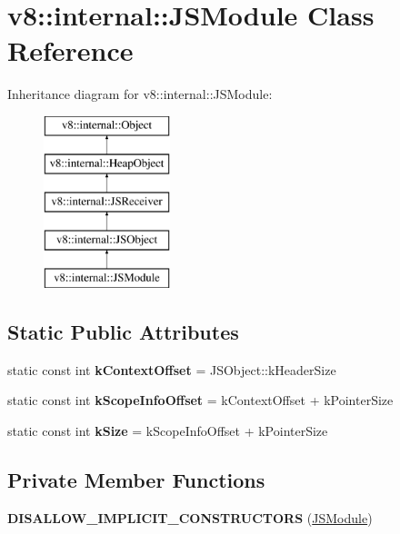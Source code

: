 \hypertarget{classv8_1_1internal_1_1_j_s_module}{}\section{v8\+:\+:internal\+:\+:J\+S\+Module Class Reference}
\label{classv8_1_1internal_1_1_j_s_module}
Inheritance diagram for v8\+:\+:internal\+:\+:J\+S\+Module\+:\begin{figure}[H]
\begin{center}
\leavevmode
\includegraphics[height=5.000000cm]{classv8_1_1internal_1_1_j_s_module}
\end{center}
\end{figure}
\subsection*{Static Public Attributes}
\begin{DoxyCompactItemize}
\item 
static const int {\bfseries k\+Context\+Offset} = J\+S\+Object\+::k\+Header\+Size\hypertarget{classv8_1_1internal_1_1_j_s_module_a9726969c27afae856ac1b2eb59671b55}{}\label{classv8_1_1internal_1_1_j_s_module_a9726969c27afae856ac1b2eb59671b55}

\item 
static const int {\bfseries k\+Scope\+Info\+Offset} = k\+Context\+Offset + k\+Pointer\+Size\hypertarget{classv8_1_1internal_1_1_j_s_module_ac143be923b04c13b6145e99b44643225}{}\label{classv8_1_1internal_1_1_j_s_module_ac143be923b04c13b6145e99b44643225}

\item 
static const int {\bfseries k\+Size} = k\+Scope\+Info\+Offset + k\+Pointer\+Size\hypertarget{classv8_1_1internal_1_1_j_s_module_acd14eb06c5ad2c3b532f178a7402b71b}{}\label{classv8_1_1internal_1_1_j_s_module_acd14eb06c5ad2c3b532f178a7402b71b}

\end{DoxyCompactItemize}
\subsection*{Private Member Functions}
\begin{DoxyCompactItemize}
\item 
{\bfseries D\+I\+S\+A\+L\+L\+O\+W\+\_\+\+I\+M\+P\+L\+I\+C\+I\+T\+\_\+\+C\+O\+N\+S\+T\+R\+U\+C\+T\+O\+RS} (\hyperlink{classv8_1_1internal_1_1_j_s_module}{J\+S\+Module})\hypertarget{classv8_1_1internal_1_1_j_s_module_ada6119acfe5bf970efbd8909276a6d85}{}\label{classv8_1_1internal_1_1_j_s_module_ada6119acfe5bf970efbd8909276a6d85}

\end{DoxyCompactItemize}
